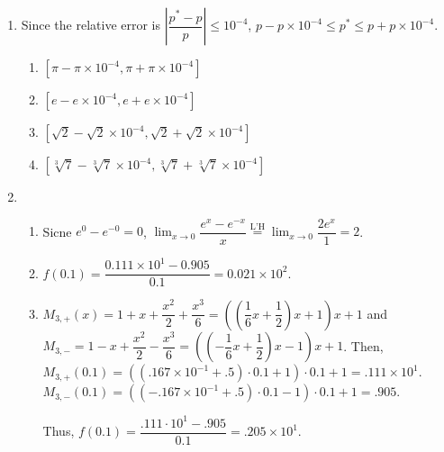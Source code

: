 \documentclass[12pt]{article}
\begin{document}
\begin{enumerate}
    \item Since the relative error is $\left|\dfrac{p^*-p}{p}\right| \leq 10^{-4}$, $p - p\times 10^{-4} \leq p^* \leq p + p\times 10^{-4}$.
    \begin{enumerate}
        \item $[\pi - \pi\times 10^{-4}, \pi + \pi\times 10^{-4}]$
        \item $[e - e\times 10^{-4}, e + e\times 10^{-4}]$
        \item $[\sqrt{2} - \sqrt{2}\times 10^{-4}, \sqrt{2} + \sqrt{2}\times 10^{-4}]$
        \item $[\sqrt[3]{7} - \sqrt[3]{7}\times 10^{-4}, \sqrt[3]{7} + \sqrt[3]{7}\times 10^{-4}]$
    \end{enumerate}

    \item \begin{enumerate}
        \item Sicne $e^{0} - e^{-0} = 0$, $\displaystyle\lim_{x \to 0} \dfrac{e^{x} - e^{-x}}{x} \overset{\text{L'H}}{=} \displaystyle\lim_{x\to 0} \dfrac{2e^{x}}{1} = 2$.
        \item $f(0.1) = \dfrac{0.111\times 10^1 - 0.905}{0.1} = 0.021\times 10^2$.
        \item $M_{3, +}(x) = 1 + x + \dfrac{x^2}{2} + \dfrac{x^3}{6} = ((\dfrac{1}{6}x + \dfrac{1}{2})x + 1)x + 1$ 
        and $M_{3, -} = 1 - x + \dfrac{x^2}{2} - \dfrac{x^3}{6} = ((-\dfrac{1}{6}x + \dfrac{1}{2})x - 1)x + 1$.
        Then, $M_{3, +}(0.1) =  ((.167\times 10^{-1} + .5)\cdot 0.1 + 1) \cdot 0.1 + 1 = .111\times 10^{1}$.
        $M_{3, -}(0.1) = ((-.167\times 10^{-1} + .5)\cdot 0.1 - 1)\cdot 0.1 + 1 = .905$.

        Thus, $f(0.1) = \dfrac{.111\cdot 10^1 - .905}{0.1} = .205 \times 10^1$.
    \end{enumerate}
\end{enumerate}
\end{document}
